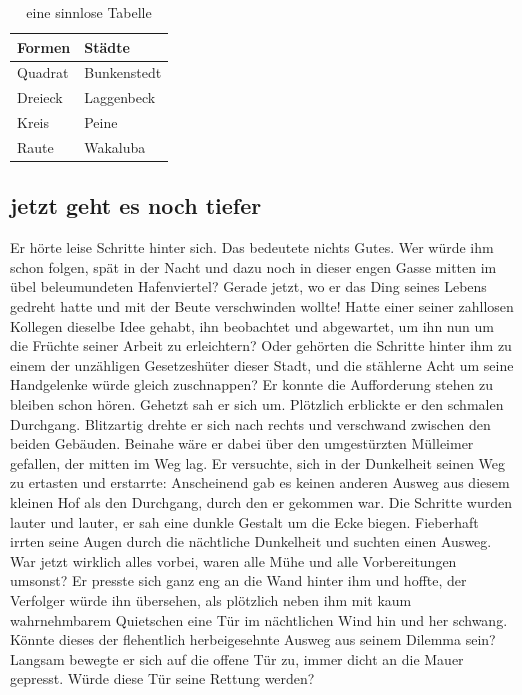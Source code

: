 \begin{table}[!hbt]\vspace{1ex}\centering\begin{tabular}{|l|l|}
\hline
Formen & Städte\\
\hline
\hline
Quadrat &  Bunkenstedt \\
\hline
Dreieck &  Laggenbeck\\
\hline
Kreis &  Peine\\
\hline
Raute & Wakaluba \\
\hline
\end{tabular}
\caption{\label{tab.sinnlos}eine sinnlose Tabelle}
\vspace{2ex}\end{table}


\subsection{jetzt geht es noch tiefer}\label{s.tiefer}

Er hörte leise Schritte hinter sich. Das bedeutete nichts Gutes. Wer würde ihm schon folgen, spät in der Nacht und dazu noch in dieser engen Gasse mitten im übel beleumundeten Hafenviertel? Gerade jetzt, wo er das Ding seines Lebens gedreht hatte und mit der Beute verschwinden wollte! Hatte einer seiner zahllosen Kollegen dieselbe Idee gehabt, ihn beobachtet und abgewartet, um ihn nun um die Früchte seiner Arbeit zu erleichtern? Oder gehörten die Schritte hinter ihm zu einem der unzähligen Gesetzeshüter dieser Stadt, und die stählerne Acht um seine Handgelenke würde gleich zuschnappen? Er konnte die Aufforderung stehen zu bleiben schon hören. Gehetzt sah er sich um. Plötzlich erblickte er den schmalen Durchgang. Blitzartig drehte er sich nach rechts und verschwand zwischen den beiden Gebäuden. Beinahe wäre er dabei über den umgestürzten Mülleimer gefallen, der mitten im Weg lag. Er versuchte, sich in der Dunkelheit seinen Weg zu ertasten und erstarrte: Anscheinend gab es keinen anderen Ausweg aus diesem kleinen Hof als den Durchgang, durch den er gekommen war. Die Schritte wurden lauter und lauter, er sah eine dunkle Gestalt um die Ecke biegen. Fieberhaft irrten seine Augen durch die nächtliche Dunkelheit und suchten einen Ausweg. War jetzt wirklich alles vorbei, waren alle Mühe und alle Vorbereitungen umsonst? Er presste sich ganz eng an die Wand hinter ihm und hoffte, der Verfolger würde ihn übersehen, als plötzlich neben ihm mit kaum wahrnehmbarem Quietschen eine Tür im nächtlichen Wind hin und her schwang. Könnte dieses der flehentlich herbeigesehnte Ausweg aus seinem Dilemma sein? Langsam bewegte er sich auf die offene Tür zu, immer dicht an die Mauer gepresst. Würde diese Tür seine Rettung werden?


